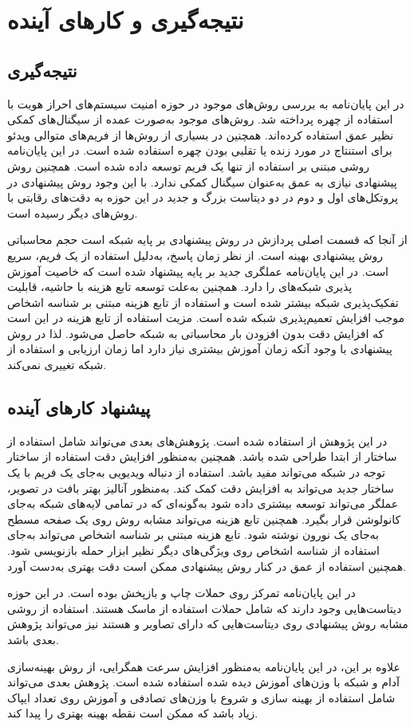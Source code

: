 \chapter{نتیجه‌گیری و کارهای آینده}
\section{نتیجه‌گیری}
در این پایان‌نامه به بررسی روش‌های موجود در حوزه امنیت سیستم‌های احراز هویت با استفاده از چهره پرداخته شد. روش‌های موجود به‌صورت عمده از سیگنال‌های کمکی نظیر عمق استفاده کرده‌اند. همچنین در بسیاری از روش‌ها از فریم‌های متوالی ویدئو برای استنتاج در مورد زنده یا تقلبی بودن چهره استفاده شده است. در این پایان‌نامه روشی مبتنی بر استفاده از تنها یک فریم توسعه داده شده است. همچنین روش پیشنهادی نیازی به عمق به‌عنوان سیگنال کمکی ندارد. با این وجود روش پیشنهادی در پروتکل‌های اول و دوم در دو دیتاست بزرگ و جدید در این حوزه به دقت‌های رقابتی با روش‌های دیگر رسیده است.

از آنجا که قسمت اصلی پردازش در روش پیشنهادی بر پایه شبکه
است حجم محاسباتی روش پیشنهادی بهینه است. از نظر زمان پاسخ، به‌دلیل استفاده از یک فریم، سریع است.
در این پایان‌نامه عملگری جدید بر پایه  پیشنهاد شده است که خاصیت آموزش پذیری شبکه‌های  را دارد. همچنین به‌علت توسعه تابع هزینه با حاشیه، قابلیت تفکیک‌پذیری شبکه بیشتر شده است و استفاده از تابع هزینه مبتنی بر شناسه اشخاص موجب افزایش تعمیم‌پذیری شبکه شده است. مزیت استفاده از تابع هزینه در این است که افزایش دقت بدون افزودن بار محاسباتی به شبکه حاصل می‌شود. لذا در روش پیشنهادی با وجود آنکه زمان آموزش بیشتری نیاز دارد اما زمان ارزیابی و استفاده از شبکه تغییری نمی‌کند.
\section{پیشنهاد کارهای آینده}
در این پژوهش از
استفاده شده است. پژوهش‌های بعدی می‌تواند شامل استفاده از ساختار از ابتدا طراحی شده باشد. همچنین به‌منظور افزایش دقت استفاده از ساختار توجه
 در شبکه می‌تواند مفید باشد. استفاده از دنباله ویدیویی به‌جای یک فریم با یک ساختار جدید می‌تواند به افزایش دقت کمک کند. به‌منظور آنالیز بهتر بافت در تصویر، عملگر  می‌تواند توسعه بیشتری داده شود به‌گونه‌ای که در تمامی لایه‌های شبکه به‌جای کانولوشن قرار بگیرد. همچنین تابع هزینه  می‌تواند مشابه روش
\cite{george2019deep}
روی یک صفحه مسطح به‌جای یک نورون نوشته شود. تابع هزینه مبتنی بر شناسه اشخاص می‌تواند به‌جای استفاده از شناسه اشخاص روی ویژگی‌های دیگر نظیر ابزار حمله بازنویسی شود. همچنین استفاده از عمق در کنار روش پیشنهادی ممکن است دقت بهتری به‌دست آورد.

در این پایان‌نامه تمرکز روی حملات چاپ و بازپخش بوده است. در این حوزه دیتاست‌هایی وجود دارند که شامل حملات استفاده از ماسک هستند. استفاده از روشی مشابه روش پیشنهادی روی دیتاست‌هایی که دارای تصاویر  و  هستند نیز می‌تواند پژوهش بعدی باشد.

علاوه بر این، در این پایان‌نامه به‌منظور افزایش سرعت همگرایی، از روش بهینه‌سازی آدام و شبکه با وزن‌های آموزش دیده شده استفاده شده است. پژوهش بعدی می‌تواند شامل استفاده از بهینه سازی  و شروع با وزن‌های تصادفی و آموزش روی تعداد ایپاک زیاد باشد که ممکن است نقطه بهینه بهتری را پیدا کند.
